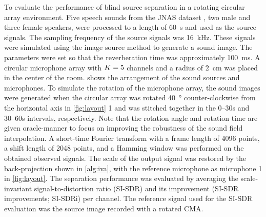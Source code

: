 \documentclass[sip,biber]{now-journal}
\begin{document}
To evaluate the performance of blind source separation in a rotating circular array environment.
Five speech sounds from the JNAS dataset \cite{Itou:1999:AST}, two male and three female speakers, were processed to a length of \SI{60}{\second} and used as the source signals.
The sampling frequency of the source signals was \SI{16}{\kilo\hertz}.
These signals were simulated using the image source method \cite{Allen:1979:JASA} to generate a sound image.
The parameters were set so that the reverberation time was approximately \SI{100}{\milli\second}.
A circular microphone array with $K = 5$ channels and a radius of \SI{2}{\centi\metre} was placed in the center of the room.
 shows the arrangement of the sound sources and microphones.
To simulate the rotation of the microphone array, the sound images were generated when the circular array was rotated \SI{40}{\degree} counter-clockwise from the horizontal axis in \cref{fig:layout} 1 and was stitched together in the 0--30\si{\second} and 30--60\si{\second} intervals, respectively.
Note that the rotation angle and rotation time are given oracle-manner to focus on improving the robustness of the sound field interpolation.
A short-time Fourier transform with a frame length of 4096 points, a shift length of 2048 points, and a Hamming window was performed on the obtained observed signals.
The scale of the output signal was restored by the back-projection shown in \cref{alg:iva}, with the reference microphone as microphone 1 in \cref{fig:layout}.
The separation performance was evaluated by averaging the scale-invariant signal-to-distortion ratio (SI-SDR) \cite{LeRoux:2019:ICASSP} and its improvement (SI-SDR improvements; SI-SDRi) per channel.
The reference signal used for the SI-SDR evaluation was the source image recorded with a rotated CMA.
\end{document}
